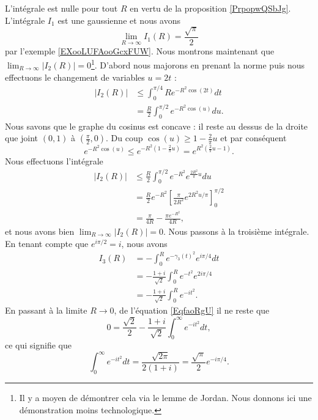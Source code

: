 L'intégrale est nulle pour tout \( R\) en vertu de la proposition \ref{PrpopwQSbJg}. L'intégrale \( I_1\) est une gaussienne et nous avons
\begin{equation}
    \lim_{R\to\infty}I_1(R)=\frac{ \sqrt{\pi} }{ 2 }
\end{equation}
par l'exemple \ref{EXooLUFAooGcxFUW}. Nous montrons maintenant que \( \lim_{R\to\infty}| I_2(R) |=0\)\footnote{Il y a moyen de démontrer cela via le lemme de Jordan. Nous donnons ici une démonstration moins technologique.}. D'abord nous majorons en prenant la norme puis nous effectuons le changement de variables \( u=2t\) :
\begin{subequations}
    \begin{align}
        | I_2(R) |&\leq \int_{0}^{\pi/4}R e^{-R^2\cos(2t)}dt\\
        &=\frac{ R }{ 2 }\int_0^{\pi/2} e^{-R^2\cos(u)}du.
    \end{align}
\end{subequations}
Nous savons que le graphe du cosinus est concave : il reste au dessus de la droite que joint \( (0,1)\) à \( (\frac{ \pi }{2},0)\). Du coup \( \cos(u)\geq 1-\frac{ 2 }{ \pi }u\) et par conséquent
\begin{equation}
        e^{-R^2\cos(u)}\leq  e^{-R^2(1-\frac{ 2 }{ \pi }u)}= e^{R^2(\frac{ 2 }{ \pi }u-1)}.
\end{equation}
Nous effectuons l'intégrale
\begin{subequations}
    \begin{align}
        | I_2(R) |&\leq \frac{ R }{2}\int_0^{\pi/2} e^{-R^2} e^{\frac{ 2R^2 }{ \pi }u}du\\
        &=\frac{ R }{2} e^{-R^2}\left[ \frac{ \pi }{ 2R^2 } e^{2R^2 u/\pi} \right]_0^{\pi/2}\\
        &=\frac{ \pi }{ 4R }-\frac{ \pi e^{-R^2} }{ 4R },
    \end{align}
\end{subequations}
et nous avons bien \( \lim_{R\to\infty}| I_2(R) |=0\). Nous passons à la troisième intégrale. En tenant compte que \(  e^{i\pi/2}=i\), nous avons
\begin{subequations}
    \begin{align}
        I_3(R)&=-\int_0^R e^{-\gamma_3(t)^2} e^{i\pi/4}dt\\
        &=-\frac{ 1+i }{ \sqrt{2} }\int_0^R e^{-t^2} e^{2i\pi/4}\\
        &=-\frac{ 1+i }{ \sqrt{2} }\int_0^R e^{-it^2}.
    \end{align}
\end{subequations}
En passant à la limite \( R\to 0 \), de l'équation \eqref{EqfaoRgU} il ne reste que
\begin{equation}
    0=\frac{ \sqrt{2} }{2}-\frac{ 1+i }{ \sqrt{2} }\int_0^{\infty} e^{-it^2}dt,
\end{equation}
ce qui signifie que
\begin{equation}
    \int_0^{\infty} e^{-it^2}dt=\frac{ \sqrt{2\pi} }{ 2(1+i) }=\frac{ \sqrt{\pi} }{2} e^{-i\pi/4}.
\end{equation}

